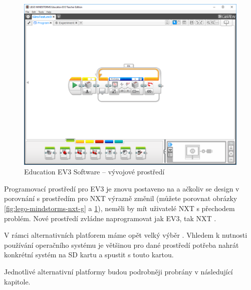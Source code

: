 \begin{figure}[h]
	\centering
	\includegraphics[width=\textwidth]{images/lego-mindstorms-ev3_dev-soft.png}
	\caption[\legoM{ }Education EV3 Software -- vývojové prostředí]{\legoM{ }Education EV3 Software -- vývojové prostředí}
	\label{fig:lego-mindstorms-ev3_dev-soft}
\end{figure}

Programovací prostředí pro EV3 je znovu postaveno na \labview{ }a ačkoliv se design v porovnání s prostředím pro NXT výrazně změnil (můžete porovnat obrázky \ref{fig:lego-mindstorms-nxt-g} a \ref{fig:lego-mindstorms-ev3_dev-soft}), neměli by mít uživatelé NXT s přechodem problém. 
% 
% 
%
%
Nové prostředí zvládne naprogramovat jak EV3, tak NXT \brick{}.
% 
% 
%
%
%
%

V rámci alternativních platforem máme opět velký výběr \cite{legoMindstormsWikipedia_programming-languages}. 
Vhledem k nutnosti používání operačního systému je většinou pro dané prostředí potřeba nahrát konkrétní systém na SD kartu a spustit \brick{ }s touto kartou.

Jednotlivé alternativní platformy budou podrobněji probrány v následující kapitole.
